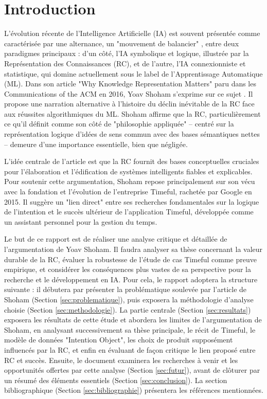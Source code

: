 \documentclass[11pt,a4paper]{article}
\begin{document}
\section{Introduction}
L'évolution récente de l'Intelligence Artificielle (IA) est souvent présentée comme caractérisée par une alternance, un "mouvement de balancier" \citep{Shoham2015Why}, entre deux paradigmes principaux : d'un côté, l'IA symbolique et logique, illustrée par la Représentation des Connaissances (RC), et de l'autre, l'IA connexionniste et statistique, qui domine actuellement sous le label de l'Apprentissage Automatique (ML). Dans son article "Why Knowledge Representation Matters" paru dans les Communications of the ACM en 2016, Yoav Shoham s'exprime sur ce sujet \citep{Shoham2015Why}. Il propose une narration alternative à l'histoire du déclin inévitable de la RC face aux réussites algorithmiques du ML. Shoham affirme que la RC, particulièrement ce qu'il définit comme son côté de "philosophie appliquée" – centré sur la représentation logique d'idées de sens commun avec des bases sémantiques nettes – demeure d'une importance essentielle, bien que négligée. 

L'idée centrale de l'article est que la RC fournit des bases conceptuelles cruciales pour l'élaboration et l'édification de systèmes intelligents fiables et explicables. Pour soutenir cette argumentation, Shoham repose principalement sur son vécu avec la fondation et l'évolution de l'entreprise Timeful, rachetée par Google en 2015. Il suggère un "lien direct" \citep{Shoham2015Why} entre ses recherches fondamentales sur la logique de l'intention \citep{Shoham2009Logics} et le succès ultérieur de l'application Timeful, développée comme un assistant personnel pour la gestion du temps. 

Le but de ce rapport est de réaliser une analyse critique et détaillée de l'argumentation de Yoav Shoham. Il faudra analyser sa thèse concernant la valeur durable de la RC, évaluer la robustesse de l'étude de cas Timeful comme preuve empirique, et considérer les conséquences plus vastes de sa perspective pour la recherche et le développement en IA. Pour cela, le rapport adoptera la structure suivante : il débutera par présenter la problématique soulevée par l'article de Shoham (Section \ref{sec:problematique}), puis exposera la méthodologie d'analyse choisie (Section \ref{sec:methodologie}). La partie centrale (Section \ref{sec:resultats}) exposera les résultats de cette étude et abordera les limites de l'argumentation de Shoham, en analysant successivement sa thèse principale, le récit de Timeful, le modèle de données "Intention Object", les choix de produit supposément influencés par la RC, et enfin en évaluant de façon critique le lien proposé entre RC et succès. Ensuite, le document examinera les recherches à venir et les opportunités offertes par cette analyse (Section \ref{sec:futur}), avant de clôturer par un résumé des éléments essentiels (Section \ref{sec:conclusion}). La section bibliographique (Section \ref{sec:bibliographie}) présentera les références mentionnées. 
\end{document}
